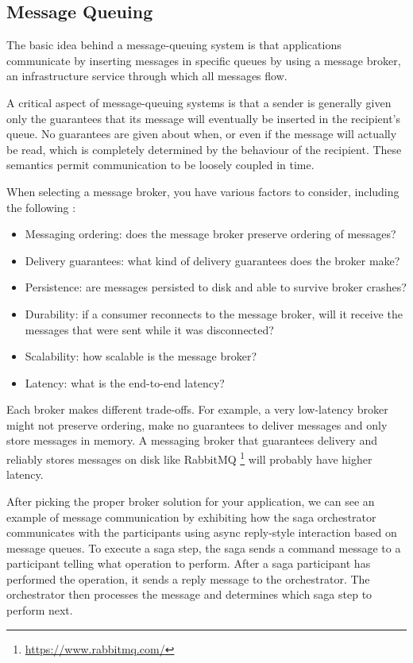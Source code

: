 \documentclass[conference]{IEEEtran}
\begin{document}
\subsection{Message Queuing}

The basic idea behind a message-queuing system is that applications communicate by inserting messages in specific queues by using a message broker, an infrastructure service through which all messages flow.

A critical aspect of message-queuing systems is that a sender is generally given only the guarantees that its message will eventually be inserted in the recipient's queue. No guarantees are given about when, or even if the message will actually be read, which is completely determined by the behaviour of the recipient. These semantics permit communication to be loosely coupled in time.

When selecting a message broker, you have various factors to consider, including the following \cite{microservices-patterns-broker}:

\begin{itemize}
  \item Messaging ordering: does the message broker preserve ordering of messages?
  \item Delivery guarantees: what kind of delivery guarantees does the broker make?
  \item Persistence: are messages persisted to disk and able to survive broker crashes?
  \item Durability: if a consumer reconnects to the message broker, will it receive the messages that were sent while it was disconnected?
  \item Scalability: how scalable is the message broker?
  \item Latency: what is the end-to-end latency?
\end{itemize}

Each broker makes different trade-offs. For example, a very low-latency broker might not preserve ordering, make no guarantees to deliver messages and only store messages in memory. A messaging broker that guarantees delivery and reliably stores messages on disk like RabbitMQ \footnote{\url{https://www.rabbitmq.com/}} will probably have higher latency.

After picking the proper broker solution for your application, we can see an example of message communication by exhibiting how the saga orchestrator communicates with the participants using async reply-style interaction based on message queues. To execute a saga step, the saga sends a command message to a participant telling what operation to perform. After a saga participant has performed the operation, it sends a reply message to the orchestrator. The orchestrator then processes the message and determines which saga step to perform next.
\end{document}
